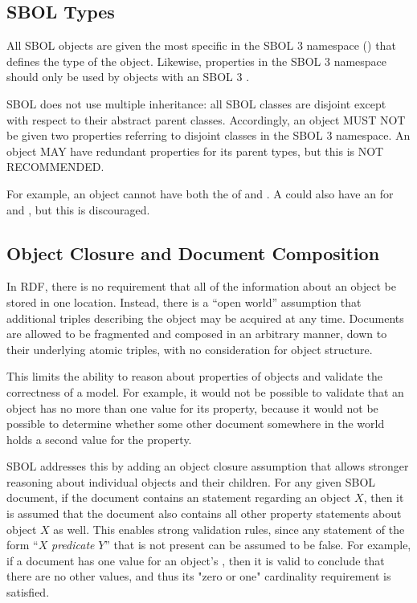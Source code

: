 \subsection{SBOL Types}
\label{sec:sbolTypes}

All SBOL objects are given the most specific  in the SBOL 3 namespace () that defines the type of the object.
Likewise, properties in the SBOL 3 namespace should only be used by objects with an SBOL 3 .

SBOL does not use multiple inheritance: all SBOL classes are disjoint except with respect to their abstract parent classes.
Accordingly, an object MUST NOT be given two  properties referring to disjoint classes in the SBOL 3 namespace.
An object MAY have redundant  properties for its parent types, but this is NOT RECOMMENDED.

For example, an object cannot have both the  of  and .
A  could also have an  for  and , but this is discouraged.


\subsection{Object Closure and Document Composition}

In RDF, there is no requirement that all of the information about an object be stored in one location.
Instead, there is a ``open world'' assumption that additional triples describing the object may be acquired at any time.
Documents are allowed to be fragmented and composed in an arbitrary manner, down to their underlying atomic triples, with no consideration for object structure.

This limits the ability to reason about properties of objects and validate the correctness of a model.
For example, it would not be possible to validate that an  object has no more than one value for its  property, because it would not be possible to determine whether some other document somewhere in the world holds a second value for the property.

SBOL addresses this by adding an object closure assumption that allows stronger reasoning about individual objects and their children.
For any given SBOL document, if the document contains an  statement regarding an  object $X$, then it is assumed that the document also contains all other property statements about object $X$ as well.
This enables strong validation rules, since any statement of the form ``$X$ {\it predicate} $Y$'' that is not present can be assumed to be false.
For example, if a document has one value for an object's , then it is valid to conclude that there are no other  values, and thus its "zero or one" cardinality requirement is satisfied.

